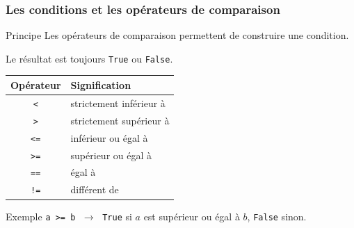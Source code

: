 \documentclass[10pt]{beamer}
\begin{document}
\begin{frame}
	\frametitle{Les conditions et les opérateurs de comparaison}
	
	
	\begin{block}{Principe}
		Les opérateurs de comparaison permettent de construire une condition.
		
		Le résultat est toujours \texttt{True} ou \texttt{False}.
	\end{block}
	
	\vspace{0.2cm}
	
	\begin{center}
		\begin{tabular}{|c|l|}
			\hline
			\textbf{Opérateur} & \textbf{Signification} \\
			\hline
			\texttt{<}  & strictement inférieur à \\
			\hline
			\texttt{>}  & strictement supérieur à \\
			\hline
			\texttt{<=} & inférieur ou égal à \\
			\hline
			\texttt{>=} & supérieur ou égal à \\
			\hline
			\texttt{==} & égal à \\
			\hline
			\texttt{!=} & différent de \\
			\hline
		\end{tabular}
	\end{center}
	
	\vspace{0.2cm}
	
	\begin{exampleblock}{Exemple}
		\centering
		\texttt{a >= b}
		$\;\longrightarrow\;$ \texttt{True} si $a$ est supérieur ou égal à $b$,
		\texttt{False} sinon.
	\end{exampleblock}
	
	
\end{frame}
\end{document}
